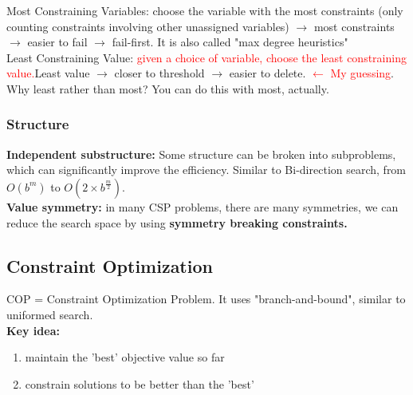 \noindent
Most Constraining Variables: choose the variable with the most constraints (only counting constraints involving other unassigned variables) $\rightarrow$ most constraints $\rightarrow$ easier to fail $\rightarrow$ fail-first. It is also called "max degree heuristics" \\

\noindent
Least Constraining Value: \textcolor{red}{given a choice of variable, choose the least constraining value.}Least value $\rightarrow$ closer to threshold $\rightarrow$ easier to delete. \textcolor{red}{$\leftarrow$ My guessing}. Why least rather than most? You can do this with most, actually.

\subsubsection{Structure}
\textbf{Independent substructure:} Some structure can be broken into subproblems, which can significantly improve the efficiency. Similar to Bi-direction search, from $O(b^{m})$ to $O(2 \times b^{\frac{m}{2}})$. \\
\textbf{Value symmetry:} in many CSP problems, there are many symmetries, we can reduce the search space by using \textbf{symmetry breaking constraints.}

\subsection{Constraint Optimization}
COP = Constraint Optimization Problem. It uses "branch-and-bound", similar to uniformed search. \\
\textbf{Key idea:} 
\begin{enumerate}
    \item maintain the 'best' objective value so far
    \item constrain solutions to be better than the 'best'
\end{enumerate}

